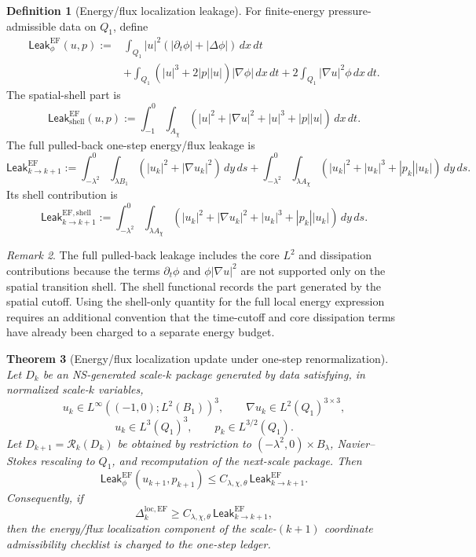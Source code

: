 \documentclass[11pt]{article}
\numberwithin{equation}{section}
\theoremstyle{plain}
\newtheorem{theorem}{Theorem}[section]
\theoremstyle{definition}
\newtheorem{definition}[theorem]{Definition}
\theoremstyle{remark}
\newtheorem{remark}[theorem]{Remark}
\newcommand{\locerr}{\mathrm{loc}}
\newcommand{\Leak}{\mathsf{Leak}}
\newcommand{\abs}[1]{\left\lvert #1\right\rvert}
\begin{document}
\begin{definition}[Energy/flux localization leakage]\label{def:ef-leak}
For finite-energy pressure-admissible data on \(Q_1\), define
\begin{align*}
  \Leak_\phi^{\mathrm{EF}}(u,p)
  :=
  &\int_{Q_1}|u|^2
  \left(\abs{\partial_t\phi}+\abs{\Delta\phi}\right)\,dx\,dt\\
  &+
  \int_{Q_1}\left(|u|^3+2|p||u|\right)
  \abs{\nabla\phi}\,dx\,dt
  +
  2\int_{Q_1}|\nabla u|^2\phi\,dx\,dt .
\end{align*}
The spatial-shell part is
\[
  \Leak_{\mathrm{shell}}^{\mathrm{EF}}(u,p)
  :=
  \int_{-1}^{0}\int_{A_\chi}
  \left(
    |u|^2+|\nabla u|^2+|u|^3+|p||u|
  \right)\,dx\,dt .
\]
The full pulled-back one-step energy/flux leakage is
\[
  \Leak_{k\to k+1}^{\mathrm{EF}}
  :=
  \int_{-\lambda^2}^{0}\int_{\lambda B_1}
  \left(|u_k|^2+|\nabla u_k|^2\right)\,dy\,ds
  +
  \int_{-\lambda^2}^{0}\int_{\lambda A_\chi}
  \left(|u_k|^2+|u_k|^3+|p_k||u_k|\right)\,dy\,ds .
\]
Its shell contribution is
\[
  \Leak_{k\to k+1}^{\mathrm{EF,shell}}
  :=
  \int_{-\lambda^2}^{0}\int_{\lambda A_\chi}
  \left(
    |u_k|^2+|\nabla u_k|^2+|u_k|^3+|p_k||u_k|
  \right)\,dy\,ds .
\]
\end{definition}

\begin{remark}
The full pulled-back leakage includes the core \(L^2\) and dissipation
contributions because the terms
\(\partial_t\phi\) and \(\phi|\nabla u|^2\) are not supported only on the
spatial transition shell.  The shell functional records the part generated
by the spatial cutoff.  Using the shell-only quantity for the full local
energy expression requires an additional convention that the time-cutoff and
core dissipation terms have already been charged to a separate energy
budget.
\end{remark}

\begin{theorem}[Energy/flux localization update under one-step renormalization]\label{thm:ef-loc-update}
Let \(D_k\) be an NS-generated scale-\(k\) package generated by data
satisfying, in normalized scale-\(k\) variables,
\[
  u_k\in L^\infty((-1,0);L^2(B_1))^3,\qquad
  \nabla u_k\in L^2(Q_1)^{3\times3},
\]
\[
  u_k\in L^3(Q_1)^3,\qquad
  p_k\in L^{3/2}(Q_1).
\]
Let \(D_{k+1}=\mathcal R_k(D_k)\) be obtained by restriction to
\((-\lambda^2,0)\times B_\lambda\), Navier--Stokes rescaling to \(Q_1\),
and recomputation of the next-scale package.  Then
\[
  \Leak_\phi^{\mathrm{EF}}(u_{k+1},p_{k+1})
  \le
  C_{\lambda,\chi,\theta}\,
  \Leak_{k\to k+1}^{\mathrm{EF}} .
\]
Consequently, if
\[
  \Delta_k^{\locerr,\mathrm{EF}}
  \ge
  C_{\lambda,\chi,\theta}\,
  \Leak_{k\to k+1}^{\mathrm{EF}},
\]
then the energy/flux localization component of the scale-\((k+1)\)
coordinate admissibility checklist is charged to the one-step ledger.
\end{theorem}
\end{document}
